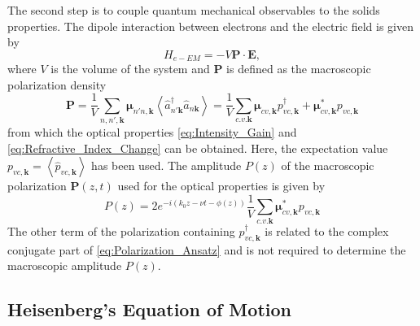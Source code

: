 The second step is to couple quantum mechanical observables to the
solids properties. The dipole interaction between electrons and the
electric field is given by \begin{equation}
H_{e-EM}=-V\mathbf{P}\cdot\mathbf{E},\end{equation}
where $V$ is the volume of the system and $\mathbf{P}$ is defined
as the macroscopic polarization density\begin{equation}
\mathbf{P}=\frac{1}{V}\sum_{n,n',\mathbf{k}}\boldsymbol{\mu}_{n'n,\mathbf{k}}\left\langle \hat{a}_{n'\mathbf{k}}^{\dagger}\hat{a}_{n\mathbf{k}}\right\rangle =\frac{1}{V}\sum_{c.v.\mathbf{k}}\boldsymbol{\mu}_{cv,\mathbf{k}}p_{vc,\mathbf{k}}^{\dagger}+\boldsymbol{\mu}_{cv,\mathbf{k}}^{*}p_{vc,\mathbf{k}}\end{equation}
from which the optical properties \ref{eq:Intensity_Gain} and \ref{eq:Refractive_Index_Change}
can be obtained. Here, the expectation value $p_{vc,\mathbf{k}}=\left\langle \hat{p}_{vc,\mathbf{k}}\right\rangle $
has been used. The amplitude $P(z)$ of the macroscopic polarization
$\mathbf{P}(z,t)$ used for the optical properties is given by \begin{equation}
P(z)=2e^{-i\left(k_{0}z-\nu t-\phi(z)\right)}\frac{1}{V}\sum_{c.v.\mathbf{k}}\boldsymbol{\mu}_{cv,\mathbf{k}}^{*}p_{vc,\mathbf{k}}\end{equation}
The other term of the polarization containing $p_{vc,\mathbf{k}}^{\dagger}$
is related to the complex conjugate part of \ref{eq:Polarization_Ansatz}
and is not required to determine the macroscopic amplitude $P(z)$.


\subsection{Heisenberg's Equation of Motion}

